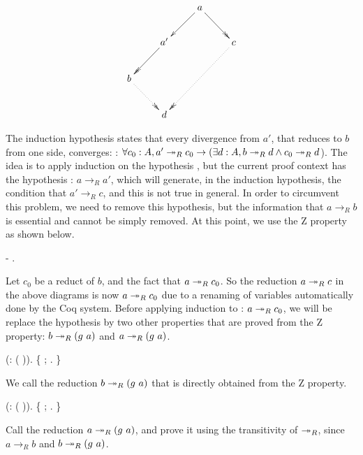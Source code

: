          \[\xymatrix{ & & a \ar@{->}[dl] \ar@{->>}[dr] & \\ & a'
        \ar@{->>}[dl] & & c \ar@{.>>}[ddll] \\ b \ar@{.>>}[dr] & & &
        \\ & d & & }\] 


        

        The induction hypothesis states that every divergence from
        $a'$, that reduces to $b$ from one side, converges: 
        : $\forall c_0 : A, a'\twoheadrightarrow_R c_0 \to (\exists d : A, b\twoheadrightarrow_R d
        \land c_0\twoheadrightarrow_R d$). The idea is to apply induction on the
        hypothesis , but the current proof context has the
        hypothesis : $a\to_R a'$, which will generate, in the
        induction hypothesis, the condition that $a'\to_R c$, and this
        is not true in general. In order to circumvent this problem,
        we need to remove this hypothesis, but the information that
        $a\to_R b$ is essential and cannot be simply removed. At this
        point, we use the Z property as shown below. \begin{coqdoccode}
\coqdocemptyline
\coqdocindent{1.00em}
-   . \end{coqdoccode}
Let $c_0$ be a reduct of $b$, and 
    the fact that $a \twoheadrightarrow_R c_0$. So the reduction $a\twoheadrightarrow_R c$ in the
    above diagrams is now $a\twoheadrightarrow_R c_0$ due to a renaming of variables
    automatically done by the Coq system. Before applying induction to
    : $a \twoheadrightarrow_R c_0$, we will be replace the hypothesis  by
    two other properties that are proved from the Z property: $b\tto_R
    (g\ a)$ and $a\tto_R (g\ a)$. \begin{coqdoccode}
\coqdocemptyline
\coqdocindent{2.00em}
 (:    ( )).\coqdoceol
\coqdocindent{2.00em}
\{  ; . \} \end{coqdoccode}
We call  the reduction
    $b\tto_R (g\ a)$ that is directly obtained from the Z property.
    \begin{coqdoccode}
\coqdocnoindent
\coqdoceol
\coqdocindent{2.00em}
 (:    ( )).\coqdoceol
\coqdocindent{2.00em}
\{    ; . \} \end{coqdoccode}
Call  the reduction
        $a\tto_R (g\ a)$, and prove it using the transitivity of
        $\twoheadrightarrow_R$, since $a \to_R b$ and $b \tto_R (g\ a)$.


